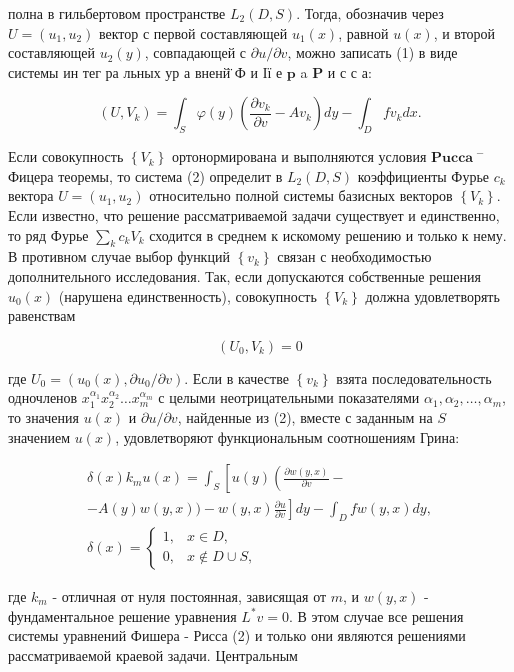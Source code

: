 \documentclass[10pt]{article}
\begin{document}
полна в гильбертовом пространстве $L_{2}(D, S)$. Тогда, обозначив через $U=\left(u_{1}, u_{2}\right)$ вектор с первой составляющей $u_{1}(x)$, равной $u(x)$, и второй составляющей $u_{2}(y)$, совпадающей с $\partial u / \partial v$, можно записать (1) в виде системы ин тег ра льных ур а вненй̈ Ф и Ії е $\mathbf{p}$ a $\mathbf{P}$ и с с а:



\[

\left(U, V_{k}\right)=\int_{S} \varphi(y)\left(\frac{\partial v_{k}}{\partial v}-A v_{k}\right) d y-\int_{D} f v_{k} d x .

\]



Если совокупность $\left\{V_{k}\right\}$ ортонормирована и выполняются условия $\boldsymbol{P u c c a ~}^{-}$Фицера теоремы, то система (2) определит в $L_{2}(D, S)$ коэффициенты Фурье $c_{k}$ вектора $U=\left(u_{1}, u_{2}\right)$ относительно полной системы базисных векторов $\left\{V_{k}\right\}$. Если известно, что решение рассматриваемой задачи существует и единственно, то ряд Фурье $\sum_{k} c_{k} V_{k}$ сходится в среднем к искомому решению и только к нему. В противном случае выбор функций $\left\{v_{k}\right\}$ связан с необходимостью дополнительного исследования. Так, если допускаются собственные решения $u_{0}(x)$ (нарушена единственность), совокупность $\left\{V_{k}\right\}$ должна удовлетворять равенствам



\[

\left(U_{0}, V_{k}\right)=0

\]



где $U_{0}=\left(u_{0}(x), \partial u_{0} / \partial v\right)$. Если в качестве $\left\{v_{k}\right\}$ взята последовательность одночленов $x_{1}^{\alpha_{1}} x_{2}^{\alpha_{2}} \ldots x_{m}^{\alpha_{m}}$ с целыми неотрицательными показателями $\alpha_{1}, \alpha_{2}, \ldots, \alpha_{m}$, то значения $u(x)$ и $\partial u / \partial v$, найденные из (2), вместе с заданным на $S$ значением $u(x)$, удовлетворяют функциональным соотношениям Грина:



\[

\begin{gathered}

\delta(x) k_{m} u(x)=\int_{S}\left[u ( y ) \left(\frac{\partial w(y, x)}{\partial v}-\right.\right. \\

\left.-A(y) w(y, x))-w(y, x) \frac{\partial u}{\partial v}\right] d y-\int_{D} f w(y, x) d y, \\

\delta(x)= \begin{cases}1, & x \in D, \\

0, & x \notin D \cup S,\end{cases}

\end{gathered}

\]



где $k_{m}$ - отличная от нуля постоянная, зависящая от $m$, и $w(y, x)$ - фундаментальное решение уравнения $L^{*} v=0$. В этом случае все решения системы уравнений Фишера - Рисса (2) и только они являются решениями рассматриваемой краевой задачи. Центральным
\end{document}

